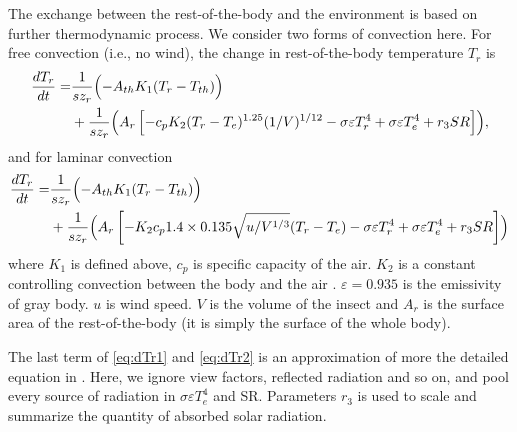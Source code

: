The exchange between the rest-of-the-body and the environment is based on further thermodynamic process. 
We consider two forms of convection here. 
For free convection (i.e., no wind), the change in rest-of-the-body temperature $T_r$ is
\begin{equation} \label{eq:dTr1} 
	\begin{split}
		\frac{dT_{r}}{dt} = & \frac{1}{s z_{r}} \Bigl( - A_{th} K_1(T_r - T_{th})  \Bigr)\\
			&+ \frac{1}{s z_{r}} \Bigl( A_r \left[ - c_p K_2 (T_r- T_e)^{1.25} (1/V)^{1/12}- \sigma \varepsilon T_r^4 + \sigma 					\varepsilon T_e^4  + r_3 SR  \right] \Bigr),
	\end{split}
\end{equation}
and for laminar convection
\begin{equation} \label{eq:dTr2}
	\begin{split}
		\frac{dT_{r}}{dt} = & \frac{1}{s z_{r}} \Bigl( - A_{th} K_1(T_r - T_{th}) \Bigl) \\
	 	  & + \frac{1}{s z_{r}} \Bigl( A_r \left[ - K_2 c_p  1.4 \times 0.135 \sqrt{u/V^{1/3}} (T_r- T_e) - \sigma \varepsilon T_r^4 				+ \sigma \varepsilon T_e^4  + r_3 SR  \right] \Bigr)
	\end{split}
\end{equation}
where $K_1$ is defined above, $c_p$ is specific capacity of the air. 
$K_2$ is a constant controlling convection between the body and the air \citep{Campbell2012}.
$\varepsilon = 0.935$  is the emissivity of gray body.
$u$ is wind speed.
$V$ is the volume of the insect and $A_r$ is the surface area of the rest-of-the-body (it is simply the surface of the whole body).

The last term of \cref{eq:dTr1} and \cref{eq:dTr2} is an approximation of more the detailed equation in \citet{Campbell2012}.
Here, we ignore view factors, reflected radiation and so on, and pool every source of radiation in $ \sigma \varepsilon T_e^4$ and SR. 
Parameters $r_3$ is used to scale and summarize the quantity of absorbed solar radiation.
 
